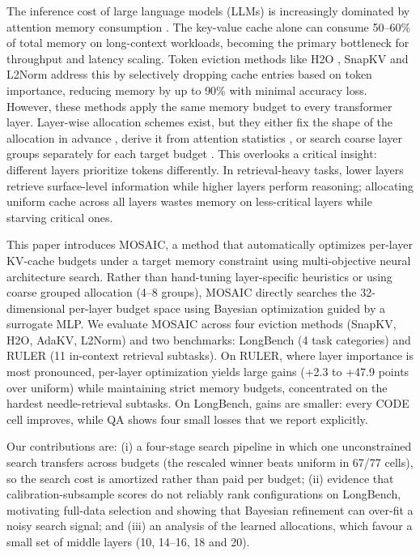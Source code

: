 \documentclass[11pt]{article}
\begin{document}
The inference cost of large language models (LLMs) is increasingly dominated by attention memory consumption \citep{dao2022flashattention}. The key-value cache alone can consume 50–60\% of total memory on long-context workloads, becoming the primary bottleneck for throughput and latency scaling. Token eviction methods like H2O \citep{zhang2023h2o}, SnapKV \citep{li2024snapkv} and L2Norm \citep{devoto2024l2norm} address this by selectively dropping cache entries based on token importance, reducing memory by up to 90\% with minimal accuracy loss. However, these methods apply the same memory budget to every transformer layer. Layer-wise allocation schemes exist, but they either fix the shape of the allocation in advance \citep{cai2025pyramidkv}, derive it from attention statistics \citep{qin2025cake}, or search coarse layer groups separately for each target budget \citep{yu2025evolkv}. This overlooks a critical insight: different layers prioritize tokens differently. In retrieval-heavy tasks, lower layers retrieve surface-level information while higher layers perform reasoning; allocating uniform cache across all layers wastes memory on less-critical layers while starving critical ones.

This paper introduces MOSAIC, a method that automatically optimizes per-layer KV-cache budgets under a target memory constraint using multi-objective neural architecture search. Rather than hand-tuning layer-specific heuristics or using coarse grouped allocation (4–8 groups), MOSAIC directly searches the 32-dimensional per-layer budget space using Bayesian optimization guided by a surrogate MLP. We evaluate MOSAIC across four eviction methods (SnapKV, H2O, AdaKV, L2Norm) and two benchmarks: LongBench (4 task categories) and RULER (11 in-context retrieval subtasks). On RULER, where layer importance is most pronounced, per-layer optimization yields large gains (+2.3 to +47.9 points over uniform) while maintaining strict memory budgets, concentrated on the hardest needle-retrieval subtasks. On LongBench, gains are smaller: every CODE cell improves, while QA shows four small losses that we report explicitly.

Our contributions are: (i) a four-stage search pipeline in which one unconstrained search transfers across budgets (the rescaled winner beats uniform in 67/77 cells), so the search cost is amortized rather than paid per budget; (ii) evidence that calibration-subsample scores do not reliably rank configurations on LongBench, motivating full-data selection and showing that Bayesian refinement can over-fit a noisy search signal; and (iii) an analysis of the learned allocations, which favour a small set of middle layers (10, 14--16, 18 and 20).
\end{document}
